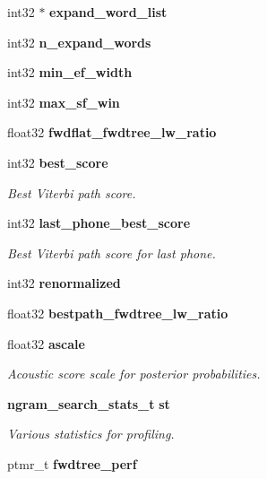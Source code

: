 \begin{DoxyCompactItemize}
\item 
int32 $\ast$ {\bfseries expand\+\_\+word\+\_\+list}\label{structngram__search__s_a4fadd755f8823c07dc5ab52f1b6d403d}

\item 
int32 {\bfseries n\+\_\+expand\+\_\+words}\label{structngram__search__s_a8a9999b6557b7c98dc03191a2d117eae}

\item 
int32 {\bfseries min\+\_\+ef\+\_\+width}\label{structngram__search__s_a88877b4dc14e04a6545c89668d8fcffc}

\item 
int32 {\bfseries max\+\_\+sf\+\_\+win}\label{structngram__search__s_a40659238fc506f7a3205eb080837008a}

\item 
float32 {\bfseries fwdflat\+\_\+fwdtree\+\_\+lw\+\_\+ratio}\label{structngram__search__s_a5772dec76068e162cebbae9f0f474aa6}

\item 
int32 {\bf best\+\_\+score}
\begin{DoxyCompactList}\small\item\em Best Viterbi path score. \end{DoxyCompactList}\item 
int32 {\bf last\+\_\+phone\+\_\+best\+\_\+score}
\begin{DoxyCompactList}\small\item\em Best Viterbi path score for last phone. \end{DoxyCompactList}\item 
int32 {\bfseries renormalized}\label{structngram__search__s_abf5988b55e39ff07d65edf61086a69da}

\item 
float32 {\bfseries bestpath\+\_\+fwdtree\+\_\+lw\+\_\+ratio}\label{structngram__search__s_a99114235f6ae8bc6d7c5849465499633}

\item 
float32 {\bf ascale}
\begin{DoxyCompactList}\small\item\em Acoustic score scale for posterior probabilities. \end{DoxyCompactList}\item 
{\bf ngram\+\_\+search\+\_\+stats\+\_\+t} {\bf st}
\begin{DoxyCompactList}\small\item\em Various statistics for profiling. \end{DoxyCompactList}\item 
ptmr\+\_\+t {\bfseries fwdtree\+\_\+perf}\label{structngram__search__s_af51ec91c4ea052252542a4ec395484d7}


\end{DoxyCompactItemize}
